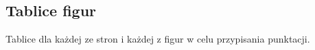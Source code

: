 \subsection{Tablice figur}
\label{subsec:tablice-figur}

{
    \color{red}
    \large Tablice dla każdej ze stron i każdej z figur w celu przypisania punktacji.
}